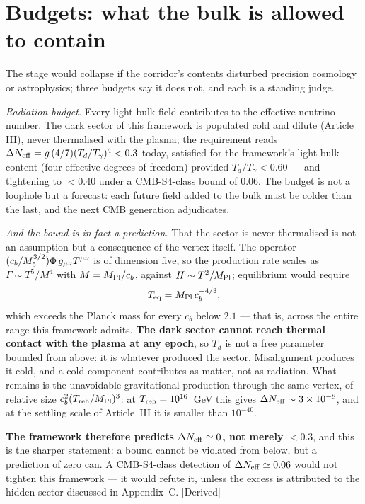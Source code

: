 \section{Budgets: what the bulk is allowed to contain}
The stage would collapse if the corridor's contents disturbed precision cosmology or astrophysics; three budgets say it does not, and each is a standing judge.

\emph{Radiation budget.} Every light bulk field contributes to the effective neutrino number. The dark sector of this framework is populated cold and dilute (Article III), never thermalised with the plasma; the requirement reads $\Delta N_{\rm eff}=g\,(4/7)(T_{d}/T_{\gamma})^{4}<0.3$ today, satisfied for the framework's light bulk content (four effective degrees of freedom) provided $T_{d}/T_{\gamma}<0.60$ --- and tightening to $<0.40$ under a CMB-S4-class bound of $0.06$. The budget is not a loophole but a forecast: each future field added to the bulk must be colder than the last, and the next CMB generation adjudicates.

\emph{And the bound is in fact a prediction.} That the sector is never thermalised is not an assumption but a consequence of the vertex itself. The operator $(c_{b}/M_5^{3/2})\Phi\,g_{\mu\nu}T^{\mu\nu}$ is of dimension five, so the production rate scales as $\Gamma\sim T^{5}/M^{4}$ with $M=M_{\rm Pl}/c_{b}$, against $H\sim T^{2}/M_{\rm Pl}$; equilibrium would require
\begin{equation}
T_{\rm eq}=M_{\rm Pl}\,c_{b}^{-4/3},
\end{equation}
which exceeds the Planck mass for every $c_{b}$ below $2.1$ --- that is, across the entire range this framework admits. \textbf{The dark sector cannot reach thermal contact with the plasma at any epoch}, so $T_{d}$ is not a free parameter bounded from above: it is whatever produced the sector. Misalignment produces it cold, and a cold component contributes as matter, not as radiation. What remains is the unavoidable gravitational production through the same vertex, of relative size $c_{b}^{2}(T_{\rm reh}/M_{\rm Pl})^{3}$: at $T_{\rm reh}=10^{16}$~GeV this gives $\Delta N_{\rm eff}\sim3\times10^{-8}$, and at the settling scale of Article~III it is smaller than $10^{-40}$.

\textbf{The framework therefore predicts $\Delta N_{\rm eff}\simeq0$, not merely $<0.3$}, and this is the sharper statement: a bound cannot be violated from below, but a prediction of zero can. A CMB-S4-class detection of $\Delta N_{\rm eff}\simeq0.06$ would not tighten this framework --- it would refute it, unless the excess is attributed to the hidden sector discussed in Appendix~C. [Derived]

